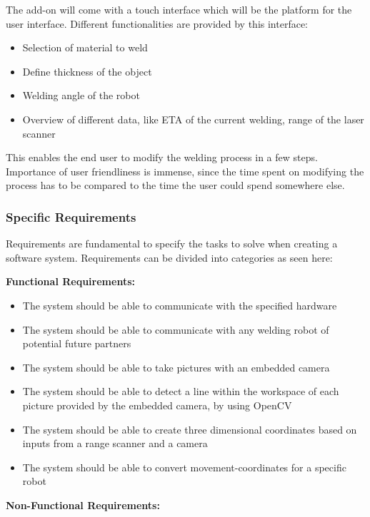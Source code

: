 The add-on will come with a touch interface which will be the platform for the user interface. Different functionalities are provided by this interface: 

\begin{itemize}

\item Selection of material to weld 
\item Define thickness of the object
\item Welding angle of the robot
\item Overview of different data, like ETA of the current welding, range of the laser scanner

\end{itemize}

This enables the end user to modify the welding process in a few steps. Importance of user friendliness is immense, since the time spent on modifying the process has to be compared to the time the user could spend somewhere else.

\subsubsection{Specific Requirements}
Requirements are fundamental to specify the tasks to solve when creating a software system. Requirements can be divided into categories as seen here:

\textbf{Functional Requirements:}
\begin{itemize}

\item The system should be able to communicate with the specified hardware
\item The system should be able to communicate with any welding robot of potential future partners
\item The system should be able to take pictures with an embedded camera 
\item The system should be able to detect a line within the workspace of each picture provided by the embedded camera, by using OpenCV
\item The system should be able to create three dimensional coordinates based on inputs from a range scanner and a camera
\item The system should be able to convert movement-coordinates for a specific robot

\end{itemize}

\textbf{Non-Functional Requirements:}


